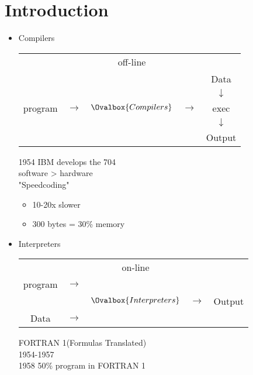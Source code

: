 \documentclass{report}
\newenvironment{cell}{%
	\tcolorbox[blanker,breakable,left=5mm,
	before skip=10pt,after skip=10pt,
	borderline west={1mm}{0pt}{stanfordred}]
}%
{\endtcolorbox}
\begin{document}
    \section{Introduction}
    \begin{itemize}
        \item Compilers
            \begin{center}
                \begin{tabular}{c c c c c}
                    & & off-line & & \\
                    & & & & Data \\
                    & & & & \(\downarrow\) \\
                    program & \(\longrightarrow\) & \(\Ovalbox{Compilers}\) & \(\longrightarrow\) & exec \\
                    & & & & \(\downarrow\) \\
                    & & & & Output \\
                \end{tabular}
            \end{center}
            \begin{cell}
                1954 IBM develops the 704 \\
                software > hardware \\
                "Speedcoding"
                \begin{itemize}
                    \item 10-20x slower
                    \item 300 bytes = 30\% memory
                \end{itemize}
            \end{cell}

        \item Interpreters
            \begin{center}
                \begin{tabular}{c c c c c}
                    & & on-line & & \\
                    program & \(\longrightarrow\) & & & \\
                    & & \(\Ovalbox{Interpreters}\) & \(\longrightarrow\) & Output \\
                    Data & \(\longrightarrow\) & & & \\
                \end{tabular}
            \end{center}
            \begin{cell}
                FORTRAN 1(Formulas Translated) \\
                1954-1957 \\
                1958 50\% program in FORTRAN 1
            \end{cell}
    \end{itemize}
\end{document}
